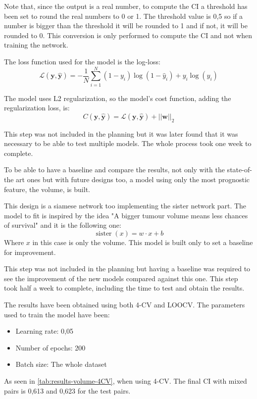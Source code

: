 Note that, since the output is a real number, to compute the \gls{CI} a threshold has been
set to round the real numbers to 0 or 1. The threshold value is 0,5 so if a number is 
bigger than the threshold it will be rounded to 1 and if not, it will be rounded to 0.
This conversion is only performed to compute the \gls{CI} and not when training the network.

The loss function used for the model is the log-loss:
\[
  \mathcal{L}(\bm{y}, \hat{\bm{y}}) = -\frac{1}{N} \sum_{i = 1}^{N}
  (1 - y_i)\log(1 - \hat{y}_i) + y_i\log(\hat{y}_i)
\]

The model uses L2 regularization, so the model's cost function, 
adding the regularization loss, is:
\[
  C(\bm{y}, \hat{\bm{y}}) = \mathcal{L}(\bm{y}, \hat{\bm{y}}) + 
  ||\bm{w}||_2
\]

This step was not included in the planning but it was later found that it was necessary to be 
able to test multiple models. The whole process took one week to complete.


To be able to have a baseline and compare the results, not only with the state-of-the art ones
but with future designs too, a model using only the most prognostic feature, the volume, is 
built.

This design is a siamese network too implementing the sister network part. The model to fit
is inspired by the idea "A bigger tumour volume means less chances of survival" 
and it is the following one:
\[
  \operatorname{sister}(x) = w\cdot x + b
\]
Where \( x \) in this case is only the volume. This model is built only to set a 
baseline for improvement.

This step was not included in the planning but having a baseline was required to see the 
improvement of the new models compared against this one. This step took half a week to complete,
including the time to test and obtain the results.


The results have been obtained using both 4-CV and \gls{LOOCV}. The parameters used to 
train the model have been:
\begin{itemize}
  \item Learning rate: 0,05
  \item Number of epochs: 200
  \item Batch size: The whole dataset
\end{itemize}

As seen in \autoref{tab:results-volume-4CV}, when using 4-CV. The final \gls{CI} with mixed pairs
is 0,613 and 0,623 for the test pairs.

